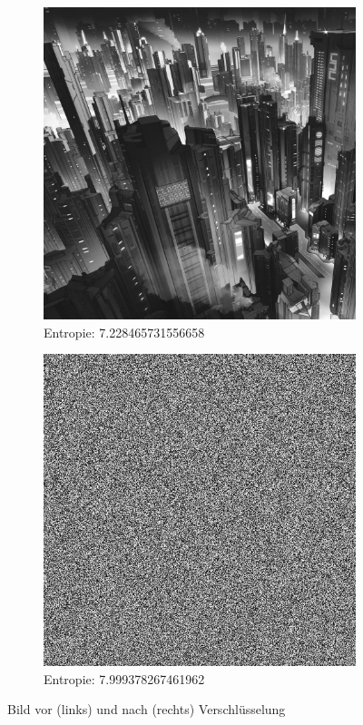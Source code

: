 \begin{figure}
	\centering

	\begin{subfigure}{0.35\textwidth}
		\includegraphics[width=\textwidth]{../1/3/gray_7.228465731556658_city.jpg}
		\caption{Entropie: 7.228465731556658}
	\end{subfigure}
	\hfill
	\begin{subfigure}{0.35\textwidth}
		\includegraphics[width=\textwidth]{../1/3/encrypted_7.999378267461962_city.jpg}
		\caption{Entropie: 7.999378267461962}
	\end{subfigure}

	\caption{Bild vor (links) und nach (rechts) Verschlüsselung}
	\label{fig:city}
\end{figure}

